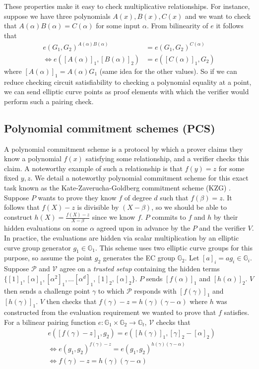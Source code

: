 These properties make it easy to check multiplicative relationships. For instance, suppose we have three polynomials $A(x), B(x), C(x)$ and we want to check that $A(\alpha)B(\alpha) = C(\alpha)$ for some input $\alpha$. From bilinearity of $e$ it follows that 
\begin{align*}
e(G_1, G_2)^{A(\alpha)B(\alpha)} &= e(G_1, G_2)^{C(\alpha)} \\
\Leftrightarrow e([A(\alpha)]_1, [B(\alpha)]_2) &= e([C(\alpha)]_1, G_2)
\end{align*}
where $[A(\alpha)]_1 = A(\alpha)G_1$ (same idea for the other values). So if we can reduce checking circuit satisfiability to checking a polynomial equality at a point, we can send elliptic curve points as proof elements with which the verifier would perform such a pairing check. 

\subsection{Polynomial commitment schemes (PCS)}
\noindent A polynomial commitment scheme is a protocol by which a prover claims they know a polynomial $f(x)$ satisfying some relationship, and a verifier checks this claim. A noteworthy example of such a relationship is that $f(y) = z$ for some fixed $y, z$. We detail a noteworthy polynomial commitment scheme for this exact task known as the Kate-Zaverucha-Goldberg commitment scheme (KZG) \cite{kzg}. Suppose $P$ wants to prove they know $f$ of degree $d$ such that $f(\beta) = z$. It follows that $f(X) - z$ is divisible by $(X - \beta)$, so we should be able to construct $h(X) = \frac{f(X) - z}{X - \beta}$ since we know $f$. $P$ commits to $f$ and $h$ by their hidden evaluations on some $\alpha$ agreed upon in advance by the $P$ and the verifier $V$. In practice, the evaluations are hidden via scalar multiplication by an elliptic curve group generator $g_1 \in \mathbb{G}_1$. This scheme uses two elliptic curve groups for this purpose, so assume the point $g_2$ generates the EC group $\mathbb{G}_2$. Let $[a]_i = ag_i \in \mathbb{G}_i$. Suppose $\mathcal{P}$ and $\mathcal{V}$ agree on a \textit{trusted setup} containing the hidden terms $\{[1]_1, [\alpha]_1, [\alpha^2]_1, \dots [\alpha^{d}]_1, [1]_2, [\alpha]_2\}$. $P$ sends $[f(\alpha)]_1$ and $[h(\alpha)]_2$. $V$ then sends a challenge point $\gamma$ to which $\mathcal{P}$ responds with $[f(\gamma)]_1$ and $[h(\gamma)]_1$. $V$ then checks that $f(\gamma) - z = h(\gamma)(\gamma - \alpha)$ where $h$ was constructed from the evaluation requirement we wanted to prove that $f$ satisfies. For a bilinear pairing function $e : \mathbb{G}_1 \times \mathbb{G}_2 \to \mathbb{G}_t$, $\mathcal{V}$ checks that 
\begin{align}
&e([f(\gamma) - z]_1, g_2) = e([h(\gamma)]_1, [\gamma]_2 - [\alpha]_2) \\
&\Leftrightarrow e(g_1, g_2)^{f(\gamma) - z} = e(g_1, g_2)^{h(\gamma)(\gamma - \alpha)} \\
&\Leftrightarrow  f(\gamma) - z = h(\gamma)(\gamma - \alpha)
\end{align}

